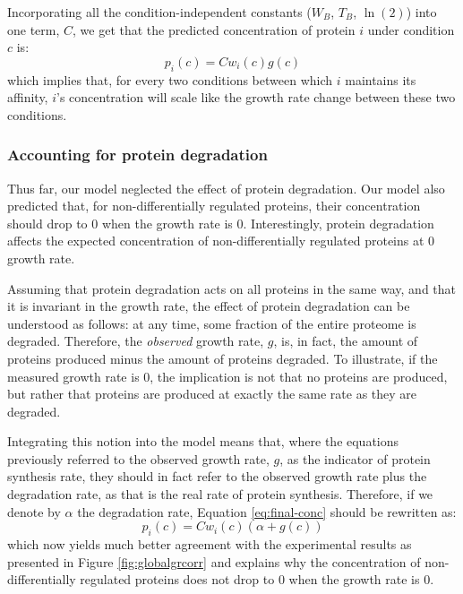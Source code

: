 \documentclass[notitlepage]{article}
\begin{document}
Incorporating all the condition-independent constants ($W_B$, $T_B$, $\ln(2)$) into one term, $C$, we get that the predicted concentration of protein $i$ under condition $c$ is:
\begin{equation}
  \label{eq:final-conc}
  p_i(c)=Cw_i(c)g(c)
\end{equation}
which implies that, for every two conditions between which $i$ maintains its affinity, $i$'s concentration will scale like the growth rate change between these two conditions.

\subsubsection{Accounting for protein degradation}
Thus far, our model neglected the effect of protein degradation.
Our model also predicted that, for non-differentially regulated proteins, their concentration should drop to 0 when the growth rate is 0.
Interestingly, protein degradation affects the expected concentration of non-differentially regulated proteins at 0 growth rate.

Assuming that protein degradation acts on all proteins in the same way, and that it is invariant in the growth rate, the effect of protein degradation can be understood as follows: at any time, some fraction of the entire proteome is degraded.
Therefore, the \emph{observed} growth rate, $g$, is, in fact, the amount of proteins produced minus the amount of proteins degraded.
To illustrate, if the measured growth rate is 0, the implication is not that no proteins are produced, but rather that proteins are produced at exactly the same rate as they are degraded.

Integrating this notion into the model means that, where the equations previously referred to the observed growth rate, $g$, as the indicator of protein synthesis rate, they should in fact refer to the observed growth rate plus the degradation rate, as that is the real rate of protein synthesis.
Therefore, if we denote by $\alpha$ the degradation rate, Equation \ref{eq:final-conc} should be rewritten as:
\begin{equation}
  \label{eq:final-conc-deg}
  p_i(c)=Cw_i(c)(\alpha+g(c))
\end{equation}
which now yields much better agreement with the experimental results as presented in Figure \ref{fig:globalgrcorr} and explains why the concentration of non-differentially regulated proteins does not drop to 0 when the growth rate is 0.
\end{document}
